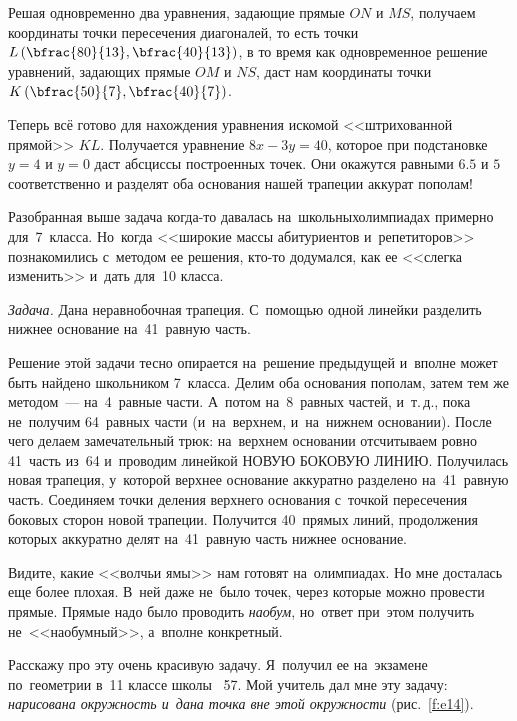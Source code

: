 Решая одновременно два уравнения, задающие прямые $ON$ и $MS$, получаем
координаты точки пересечения диагоналей, то есть точки $L \left(\bfrac{80}{13}, \bfrac{40}{13}\right)$,
в то время как одновременное решение уравнений, задающих прямые $OM$ и $NS$, даст
нам координаты точки $K \left(\bfrac{50}{7}, \bfrac{40}{7}\right)$.


Теперь всё готово для нахождения уравнения искомой <<штрихованной прямой>> $KL$.
Получается уравнение $8x-3y=40$, которое при подстановке $y=4$ и $y=0$ даст абсциссы
построенных точек.
 Они окажутся равными $6.5$ и $5$ соответственно и разделят оба
основания нашей трапеции аккурат пополам!

Разобранная выше задача когда-то давалась на~школьных\linebreak олимпиадах примерно для~7~класса. Но~когда
<<широкие массы абитуриентов и~репетиторов>> познакомились с~методом ее решения, кто-то додумался,
как ее <<слегка изменить>> и~дать для~10 класса.

\textit{Задача.} Дана неравнобочная трапеция. С~помощью одной линейки разделить нижнее основание на~41~равную часть.

Решение этой задачи тесно опирается на~решение предыдущей и~вполне может быть найдено школьником 7~класса.
Делим оба основания пополам, затем тем же методом~--- на~4~равные части. А~потом на~8~равных частей, и~т.\,д.,
пока не~получим 64~равных части (и~на~верхнем, и~на~нижнем основании). После
чего делаем замечательный трюк: на~верхнем основании отсчитываем ровно 41~часть из~64 и~проводим
линейкой НОВУЮ БОКОВУЮ ЛИНИЮ. Получилась новая трапеция, у~которой верхнее основание аккуратно
разделено на~41~равную часть. Соединяем точки деления верхнего основания с~точкой пересечения
боковых сторон новой трапеции. Получится 40~прямых линий, продолжения которых аккуратно делят на~41~равную
часть нижнее основание.

Видите, какие <<волчьи ямы>> нам готовят на~олимпиадах. Но мне досталась еще более плохая. В~ней даже не~было
точек, через которые можно провести прямые. Прямые надо было проводить \textit{наобум}, но~ответ при~этом
получить не~<<наобумный>>, а~вполне конкретный.

Расскажу про эту очень красивую задачу. Я~получил ее на~экзамене по~геометрии
в~11 классе школы \No~57. Мой учитель дал мне эту задачу: \textit{нарисована окружность и~дана точка
вне этой окружности} (рис.~\ref{f:e14}).



